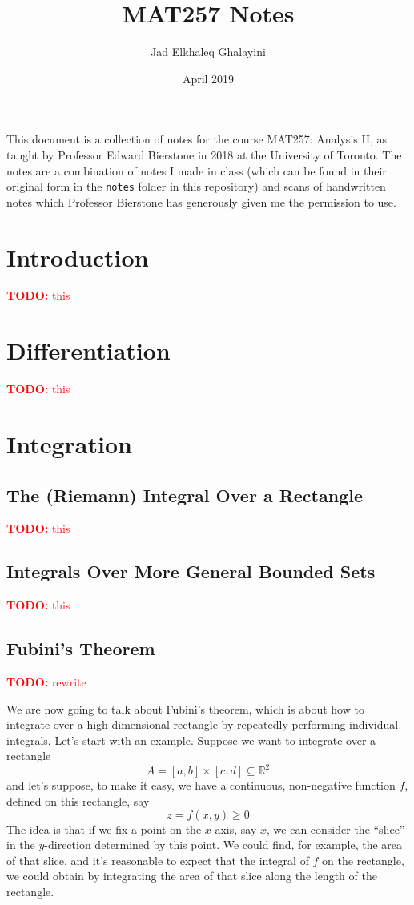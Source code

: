 \documentclass{article}
\title{MAT257 Notes}
\author{Jad Elkhaleq Ghalayini}
\date{April 2019}
\newcommand{\reals}[0]{\mathbb{R}}
\newcommand{\TODO}[1]{\textcolor{red}{\textbf{TODO:} #1}}
\begin{document}
\maketitle

This document is a collection of notes for the course MAT257: Analysis II, as taught by Professor Edward Bierstone in 2018 at the University of Toronto. The notes are a combination of notes I made in class (which can be found in their original form in the \verb|notes| folder in this repository) and scans of handwritten notes which Professor Bierstone has generously given me the permission to use.

\section{Introduction}

\TODO{this}

\section{Differentiation}

\TODO{this}

\section{Integration}

\subsection{The (Riemann) Integral Over a Rectangle}

\TODO{this}

\subsection{Integrals Over More General Bounded Sets}

\TODO{this}

\subsection{Fubini's Theorem}

\TODO{rewrite}

We are now going to talk about Fubini's theorem, which is about how to integrate over a high-dimensional rectangle by repeatedly performing individual integrals. Let's start with an example. Suppose we want to integrate over a rectangle
\begin{equation}
  A = [a, b] \times [c, d] \subseteq \reals^2
\end{equation}
and let's suppose, to make it easy, we have a continuous, non-negative function \(f\), defined on this rectangle, say
\begin{equation}
  z = f(x, y) \geq 0
\end{equation}
The idea is that if we fix a point on the \(x\)-axis, say \(x\), we can consider the ``slice'' in the \(y\)-direction determined by this point. We could find, for example, the area of that slice, and it's reasonable to expect that the integral of \(f\) on the rectangle, we could obtain by integrating the area of that slice along the length of the rectangle.
\end{document}
